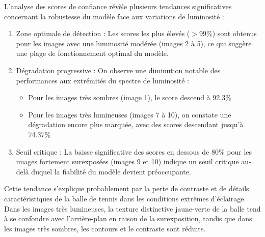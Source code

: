 \documentclass{article}
\begin{document}
L'analyse des scores de confiance révèle plusieurs tendances significatives concernant la robustesse du modèle face aux variations de luminosité :

\begin{enumerate}
    \item Zone optimale de détection : Les scores les plus élevés ($>99\%$) sont obtenus pour les images avec une luminosité modérée (images 2 à 5), ce qui suggère une plage de fonctionnement optimal du modèle.
    \item Dégradation progressive : On observe une diminution notable des performances aux extrémités du spectre de luminosité :
    \begin{itemize}
        \item Pour les images très sombres (image 1), le score descend à 92.3\%
        \item Pour les images très lumineuses (images 7 à 10), on constate une dégradation encore plus marquée, avec des scores descendant jusqu'à 74.37\%
    \end{itemize}
    \item Seuil critique : La baisse significative des scores en dessous de 80\% pour les images fortement surexposées (images 9 et 10) indique un seuil critique au-delà duquel la fiabilité du modèle devient préoccupante.
\end{enumerate}

Cette tendance s'explique probablement par la perte de contraste et de détails caractéristiques de la balle de tennis dans les conditions extrêmes d'éclairage. Dans les images très lumineuses, la texture distinctive jaune-verte de la balle tend à se confondre avec l'arrière-plan en raison de la surexposition, tandis que dans les images très sombres, les contours et le contraste sont réduits.
\end{document}
